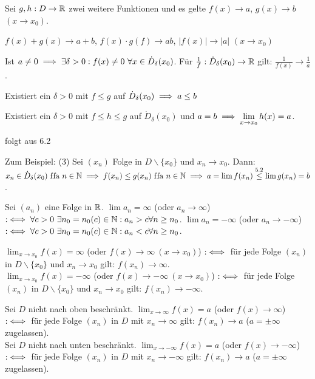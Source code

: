 \documentclass[a4paper,twoside,DIV15,BCOR12mm]{scrbook}
\begin{document}
\begin{satz}
Sei $g, h: D \to \mathbb{R}$ zwei weitere Funktionen und es gelte $f(x) \to a$, $g(x)\to b$ $(x\to x_0)$.
\begin{liste}
\item $f(x)+g(x) \to a+b$, $f(x)\cdot g(f) \to ab$, $|f(x)| \to |a|$ $(x\to x_0)$
\item Ist $a \ne 0 \implies \exists \delta>0: f(x)\ne 0 \ \forall x\in\dot D_\delta(x_0)$. Für $\frac{1}{f}: \dot D_\delta(x_0) \to \mathbb{R}$ gilt: $\frac{1}{f(x)} \to \frac{1}{a}$.
\item Existiert ein $\delta > 0 $ mit $f \le g$ auf $\dot D_\delta(x_0) \implies a \le b$
\item Existiert ein $\delta > 0$ mit $f \le h \le g$ auf $\dot D_\delta(x_0)$ und $a = b \implies \displaystyle\lim_{x\to x_0} h(x) = a$.
\end{liste}
\end{satz}

\begin{beweis}
folgt aus 6.2

Zum Beispiel: (3) Sei $(x_n)$ Folge in $D\backslash\{x_0\}$ und $x_n \to x_0$. Dann: $x_n \in \dot D_\delta(x_0) \text{ f\/fa } n\in\mathbb{N} \implies f(x_n) \le g(x_n) \text{ f\/fa } n\in\mathbb{N} \implies a = \lim f(x_n) \stackrel{\text{5.2}}{\le} \lim g(x_n) = b$.
\end{beweis}

\begin{definition}
\begin{liste}
\item Sei $(a_n)$ eine Folge in $\mathbb{R}$. $\lim a_n = \infty$ (oder $a_n \to \infty$) $:\iff \forall c>0 \ \exists n_0 = n_0(c)\in\mathbb{N}: a_n > c \forall n\ge n_0$. $\lim a_n = -\infty$ (oder $a_n \to -\infty$) $:\iff \forall c>0 \ \exists n_0 = n_0(c)\in\mathbb{N}: a_n < c \forall n\ge n_0$. 
\item $\displaystyle\lim_{x\to x_0} f(x) = \infty$ (oder $f(x) \to \infty\ (x\to x_0)$) $:\iff$ für jede Folge $(x_n)$ in $D\backslash\{x_0\}$  und $x_n \to x_0$ gilt: $f(x_n) \to \infty$. \\
$\displaystyle\lim_{x\to x_0} f(x) = -\infty$ (oder $f(x) \to -\infty\ (x\to x_0)$) $:\iff$ für jede Folge $(x_n)$ in $D\backslash\{x_0\}$  und $x_n \to x_0$ gilt: $f(x_n) \to -\infty$.
\item Sei $D$ nicht nach oben beschränkt. $\displaystyle\lim_{x\to \infty} f(x) = a$ (oder $f(x) \to \infty$) $:\iff$ für jede Folge $(x_n)$ in $D$ mit $x_n\to \infty$ gilt: $f(x_n) \to a$ ($a = \pm\infty$ zugelassen). \\
Sei $D$ nicht nach unten beschränkt. $\displaystyle\lim_{x\to -\infty} f(x) = a$ (oder $f(x) \to -\infty$) $:\iff$ für jede Folge $(x_n)$ in $D$ mit $x_n\to -\infty$ gilt: $f(x_n) \to a$ ($a = \pm\infty$ zugelassen). \\
\end{liste}
\end{definition}
\end{document}
